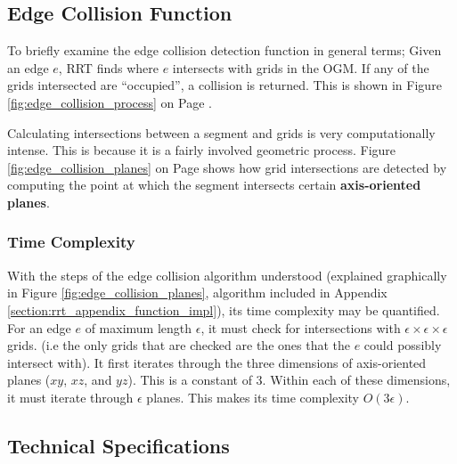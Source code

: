 \subsection{Edge Collision Function}
\label{subsection:EdgeCollisionFunction}
    To briefly examine the edge collision detection function in general terms; Given an edge $e$, \gls{RRT} finds where $e$ intersects with grids in the \gls{OGM}. If any of the grids intersected are ``occupied'', a collision is returned. This is shown in Figure \ref{fig:edge_collision_process} on Page \pageref{fig:edge_collision_process}. 

    Calculating intersections between a segment and grids is very computationally intense. This is because it is a fairly involved geometric process. Figure \ref{fig:edge_collision_planes} on Page \pageref{fig:edge_collision_planes} shows how grid intersections are detected by computing the point at which the segment intersects certain \textbf{\glspl{axis-oriented plane}}.  

    \subsubsection{Time Complexity}
        With the steps of the edge collision algorithm understood (explained graphically in Figure \ref{fig:edge_collision_planes}, algorithm included in Appendix \ref{section:rrt_appendix_function_impl}), its \gls{time complexity} may be quantified. 
        For an edge $e$ of maximum length $\epsilon$, it must check for intersections with $\epsilon \times \epsilon \times \epsilon$ grids. (i.e the only grids that are checked are the ones that the $e$ could possibly intersect with). 
        It first iterates through the three dimensions of \glspl{axis-oriented plane} ($xy$, $xz$, and $yz$). This is a constant of 3. 
        Within each of these dimensions, it must iterate through $\epsilon$ planes. This makes its time complexity $O(3\epsilon)$. 

        

        
   
\subsection{Technical Specifications}
\label{subsection:HoneyBeeSpecs}

